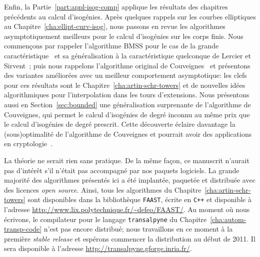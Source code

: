 Enfin, la Partie~\ref{part:appl-isog-comp} applique les résultats des
chapitres précédents au calcul d'isogénies. Après quelques rappels sur
les courbes elliptiques au Chapitre~\ref{cha:ellipt-curv-isog}, nous
passons en revue les algorithmes asymptotiquement meilleurs pour le
calcul d'isogénies sur les corps finis. Nous commençons par rappeler
l'algorithme BMSS pour le cas de la grande
caractéristique~\cite{bostan+morain+salvy+schost08} et sa
généralisation à la caractéristique quelconque de Lercier et
Sirvent~\cite{lercier+sirvent08}; puis nous rappelons l'algorithme
original de Couveignes~\cite{couveignes96} et présentons des variantes
améliorées avec un meilleur comportement asymptotique: les clefs pour
ces résultats sont le Chapitre~\ref{cha:artin-schr-towers} et de
nouvelles idées algorithmiques pour l'interpolation dans les tours
d'extensions. Nous présentons aussi en Section~\ref{sec:bounded} une
généralisation surprenante de l'algorithme de Couveignes, qui permet
le calcul d'isogénies de degré inconnu au même prix que le calcul
d'isogénies de degré prescrit. Cette découverte éclaire davantage la
(sous)optimalité de l'algorithme de Couveignes et pourrait avoir des
applications en
cryptologie~\cite{gaudry+hess+smart02,GHS,hess03,teske06}.

  La
théorie ne serait rien sans pratique. De la même façon, ce manuscrit
n'aurait pas d'intérêt s'il n'était pas accompagné par nos paquets
logiciels. La grande majorité des algorithmes présentés ici a été
implantée, paquetée et distribuée avec des licences \emph{open
  source}. Ainsi, tous les algorithmes du
Chapitre~\ref{cha:artin-schr-towers} sont disponibles dans la
bibliothèque \texttt{FAAST}, écrite en \texttt{C++} et disponible à
l'adresse \url{http://www.lix.polytechnique.fr/~defeo/FAAST/}.  Au
moment où nous écrivons, le compilateur pour le langage
\texttt{transalpyne} du Chapitre~\ref{cha:autom-transp-code} n'est pas
encore distribué; nous travaillons en ce moment à la première
\emph{stable release} et espérons commencer la distribution au début
de 2011. Il sera disponible à l'adresse
\url{ http://transalpyne.gforge.inria.fr/}.




